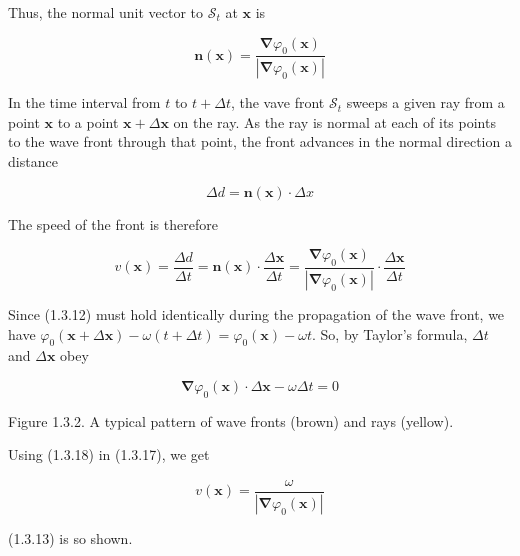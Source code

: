 \documentclass{article}
\begin{document}
Thus, the normal unit vector to $\mathcal{S}_{t}$ at $\boldsymbol{x}$ is
 
\begin{equation*}
\boldsymbol{n}(\boldsymbol{x})=\frac{\boldsymbol{\nabla} \varphi_{0}(\boldsymbol{x})}{\left|\boldsymbol{\nabla} \varphi_{0}(\boldsymbol{x})\right|} \tag{1.3.15}
\end{equation*}
 

In the time interval from $t$ to $t+\Delta t$, the vave front $\mathcal{S}_{t}$ sweeps a given ray from a point $\boldsymbol{x}$ to a point $\boldsymbol{x}+\Delta \boldsymbol{x}$ on the ray. As the ray is normal at each of its points to the wave front through that point, the front advances in the normal direction a distance
 
\begin{equation*}
\Delta d=\boldsymbol{n}(\boldsymbol{x}) \cdot \Delta x \tag{1.3.16}
\end{equation*}
 

The speed of the front is therefore
 
\begin{equation*}
v(\boldsymbol{x})=\frac{\Delta d}{\Delta t}=\boldsymbol{n}(\boldsymbol{x}) \cdot \frac{\Delta \boldsymbol{x}}{\Delta t}=\frac{\boldsymbol{\nabla} \varphi_{0}(\boldsymbol{x})}{\left|\boldsymbol{\nabla} \varphi_{0}(\boldsymbol{x})\right|} \cdot \frac{\Delta \boldsymbol{x}}{\Delta t} \tag{1.3.17}
\end{equation*}
 

Since (1.3.12) must hold identically during the propagation of the wave front, we have $\varphi_{0}(\boldsymbol{x}+\Delta \boldsymbol{x})-\omega(t+\Delta t)=\varphi_{0}(\boldsymbol{x})-\omega t$. So, by Taylor's formula, $\Delta t$ and $\Delta \boldsymbol{x}$ obey
 
\begin{equation*}
\boldsymbol{\nabla} \varphi_{0}(\boldsymbol{x}) \cdot \Delta \boldsymbol{x}-\omega \Delta t=0 \tag{1.3.18}
\end{equation*}
 

Figure 1.3.2. A typical pattern of wave fronts (brown) and rays (yellow).

Using (1.3.18) in (1.3.17), we get
 
\begin{equation*}
v(\boldsymbol{x})=\frac{\omega}{\left|\boldsymbol{\nabla} \varphi_{0}(\boldsymbol{x})\right|} \tag{1.3.19}
\end{equation*}
 
(1.3.13) is so shown.
\end{document}
